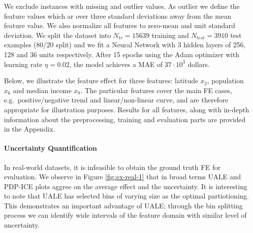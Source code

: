 \documentclass[twoside]{article}
\begin{document}
We exclude instances with missing and outlier values. As outlier we
define the feature values which ar over three standard deviations away
from the mean feature value. We also normalize all features to
zero-mean and unit standard deviation. We split the dataset into
\(N_{tr} = 15639\) training and \(N_{test} = 3910\) test examples
(80/20 split) and we fit a Neural Network with 3 hidden layers of 256,
128 and 36 units respectively. After 15 epochs using the Adam
optimizer with learning rate \(\eta = 0.02\), the model achieves a MAE
of \(37 \cdot 10^3\) dollars.

Below, we illustrate the feature effect for three features: latitude
\(x_2\), population \(x_6\) and median income \(x_8\). The particular
features cover the main FE cases, e.g.~positive/negative trend and
linear/non-linear curve, and are therefore appropriate for
illustration purposes. Results for all features, along with in-depth
information about the preprocessing, training and evaluation parts are
provided in the Appendix.

\paragraph{Uncertainty Quantification}

In real-world datasets, it is infeasible to obtain the ground truth FE
for evaluation. We observe in Figure \ref{fig:ex-real-1} that in broad
terms UALE and PDP-ICE plots aggree on the average effect and the
uncertainty. It is interesting to note that UALE has selected bins of
varying size as the optimal partiotioning. This demonstrates an
important advantage of UALE; through the bin splitting process we can
identify wide intervals of the feature domain with similar level of
uncertainty.

\end{document}
